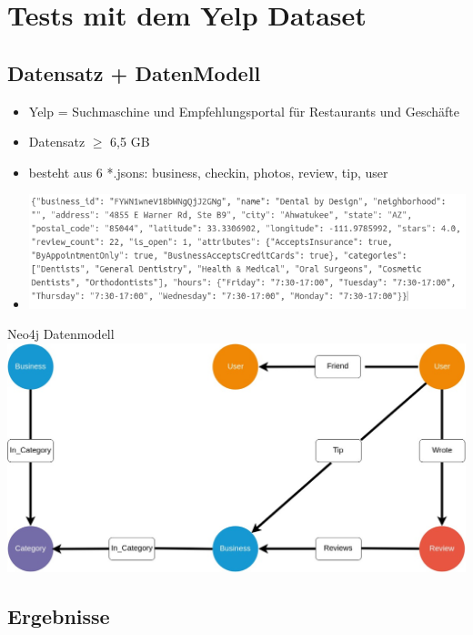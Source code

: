 \documentclass[12pt,usenames,dvipsnames]{beamer}
\begin{document}
\section{Tests mit dem Yelp Dataset}
\subsection{Datensatz + DatenModell}
\begin{frame}
\begin{itemize}[<+- | alert@+>]
\item Yelp = Suchmaschine und Empfehlungsportal für Restaurants und Geschäfte 
\item Datensatz $\geq$ 6,5 GB
\item besteht aus 6 *.jsons: business, checkin, photos, review, tip,  user
\item \includegraphics[width=1.0\textwidth]{business}
\end{itemize}
\end{frame}
\begin{frame}{Neo4j Datenmodell}
\includegraphics[width=1\textwidth]{neo4jModell}

\end{frame}
\subsection{Ergebnisse}
\end{document}

